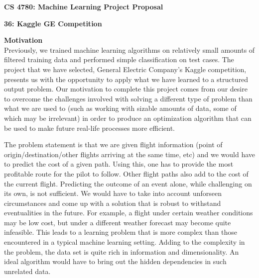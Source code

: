 \documentclass{article}[9pt]
\begin{document}
\begin{framed}
\noindent
\large{\textbf{CS 4780: Machine Learning \hfill Project Proposal}}
\end{framed}
\begin{center}
	\textbf{\Large{36: Kaggle GE Competition}}
\end{center}
\noindent\Large{\textbf{Motivation}}\\
\noindent Previously, we trained machine learning algorithms on relatively small amounts of filtered training data and performed simple classification on test cases. The project that we have selected, General Electric Company's Kaggle competition, presents us with the opportunity to apply what we have learned to a structured output problem. Our motivation to complete this project comes from our desire to overcome the challenges involved with solving a different type of problem than what we are used to (such as working with sizable amounts of data, some of which may be irrelevant) in order to produce an optimization algorithm that can be used to make future real-life processes more efficient.

The problem statement is that we are given flight information (point of origin/destination/other flights arriving at the same time, etc) and we would have to predict the cost of a given path. Using this, one has to provide the most profitable route for the pilot to follow. Other flight paths also add to the cost of the current flight. Predicting the outcome of an event alone, while challenging on its own, is not sufficient. We would have to take into account unforseen circumstances and come up with a solution that is robust to withstand eventualities in the future. For example, a flight under certain weather conditions may be low cost, but under a different weather forecast may become quite infeasible. This leads to a learning problem that is more complex than those encountered in a typical machine learning setting. Adding to the complexity in the problem, the data set is quite rich in information and dimensionality. An ideal algorithm would have to bring out the hidden dependencies in such unrelated data.
\end{document}
